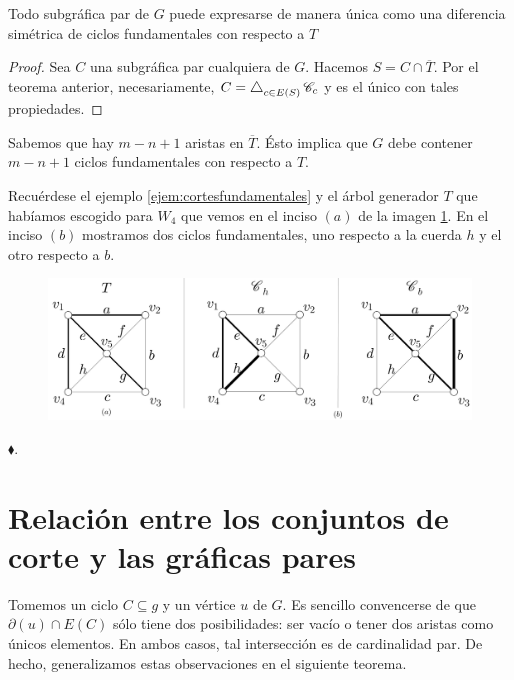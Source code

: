  \begin{cor} \label{cor:baseciclosfundamentales}
Todo subgráfica par de $G$ puede expresarse de manera única como una diferencia simétrica de ciclos fundamentales con respecto a $T$  
 \end{cor}
 
 \begin{proof}
 Sea $C$ una subgráfica par cualquiera de $G$. Hacemos $S= C \cap \overline{T}$. Por el teorema anterior, necesariamente, $C = \difsym_{c \in E(S)} \mathscr{C}_{c}$ y es el único con tales propiedades. 
 
 \end{proof}
 
 Sabemos que hay $m - n + 1$ aristas en $\overline{T}$. Ésto implica que $G$ debe contener $m - n +1$ ciclos fundamentales con respecto a $T$.
 
 \begin{ejem}
 Recuérdese el ejemplo \ref{ejem:cortesfundamentales} y el árbol generador $T$ que habíamos escogido para $W_{4}$ que vemos en el inciso $(a)$ de la imagen \ref{fig:ciclosfundamentales}. En el inciso $(b)$ mostramos dos ciclos fundamentales, uno respecto a la cuerda $h$ y el otro respecto a $b$.
 
 \begin{figure}[H]
     \centering
     \includegraphics[scale=0.15]{img/imgchapter2/ciclosfundamentales.jpg}
     \caption{}
     \label{fig:ciclosfundamentales}
 \end{figure}
 
 \hfill $\blacklozenge$.
 \end{ejem}
 
 \section{Relación entre los conjuntos de corte y las gráficas pares}
 Tomemos un ciclo $C \subseteq g$ y un vértice $u$ de $G$. Es sencillo convencerse de que $\partial(u) \cap E(C)$ sólo tiene dos posibilidades: ser vacío o tener dos aristas como únicos elementos. En ambos casos, tal intersección es de cardinalidad par. De hecho, generalizamos estas observaciones en el siguiente teorema.

